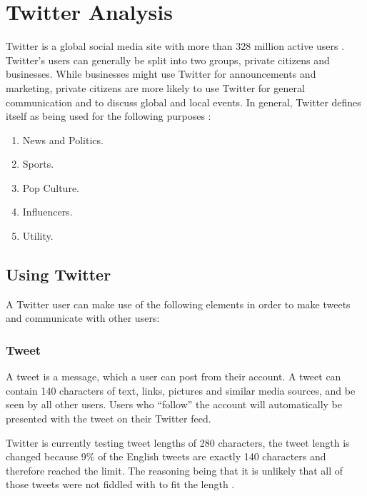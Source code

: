 \section{Twitter Analysis}\label{sec:twitter-analysis}
Twitter is a global social media site with more than 328 million active users
\citep{aboutTwitter}. Twitter's users
can generally be split into two groups, private citizens and businesses. While businesses might use Twitter for
announcements and marketing, private citizens are more likely to use Twitter for
general communication and to discuss global and local events. In general,
Twitter defines itself as being used for the following purposes
\citep{StartingTwitter}:

\begin{enumerate}    
  \item News and Politics.
  \item Sports.
  \item Pop Culture. 
  \item Influencers.
  \item Utility.
\end{enumerate} %

\subsection{Using Twitter}
A Twitter user can make use of the following elements \citep{StartingTwitter}
in order to make tweets and communicate with other users:

\subsubsection{Tweet}
A tweet is a message, which a user can post from their account. A tweet can
contain 140 characters \citep{StartingTwitter2}  of text, links, pictures and similar media sources, and be
seen by all other users. Users who ``follow'' the account will automatically be
presented with the tweet on their Twitter feed.

Twitter is currently testing tweet lengths of 280 characters, the tweet length
is changed because 9\% of the English tweets are exactly 140 characters and
therefore reached the limit. The reasoning being that it is unlikely that all of
those tweets were not fiddled with to fit the length \citep{TweetL} .


